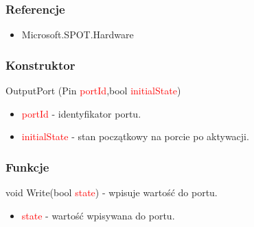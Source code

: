 \documentclass{article}
\begin{document}
\subsubsection{Referencje}
\begin{itemize}
\item Microsoft.SPOT.Hardware
\end{itemize}
\subsubsection{Konstruktor}
 OutputPort (Pin \textcolor{red}{portId},bool \textcolor{red}{initialState})
\begin{itemize}
\item \textcolor{red}{portId} - identyfikator portu.
\item \textcolor{red}{initialState} - stan początkowy na porcie po aktywacji.
\end{itemize}
\subsubsection{Funkcje}
void Write(bool \textcolor{red}{state}) - wpisuje wartość do portu.
\begin{itemize}
\item \textcolor{red}{state} - wartość wpisywana do portu.
\end{itemize}
\end{document}
